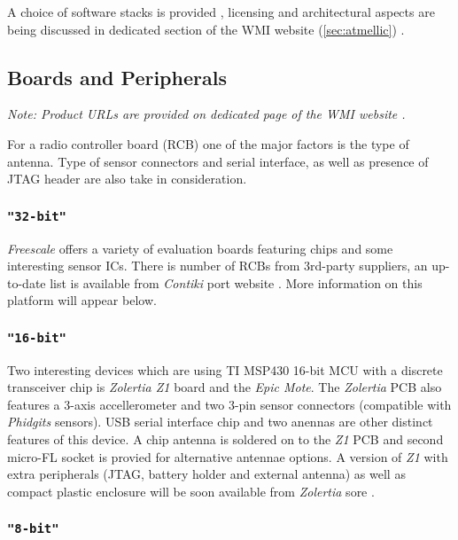  A choice of software stacks is provided \cite{atmel:avr2070,
 atmel:avr2025, atmel:avr2102, atmel:zbpro}, licensing and architectural
 aspects are being discussed in dedicated section of the WMI website
 (\ref{sec:atmellic}) \cite{wmi:wiki:atmelsw}.

\subsection{Boards and Peripherals}

 \emph{Note: Product URLs are provided on dedicated page of the WMI
 website \cite{wmi:wiki:devhw}.}
 \newline

 For a radio controller board (RCB) one of the major factors is the
 type of antenna. Type of sensor connectors and serial interface,
 as well as presence of JTAG header are also take in consideration.

\subsubsection{\texttt{"32-bit"}}

 \emph{Freescale} offers a variety of evaluation boards featuring
  chips and some interesting sensor ICs. There is
 number of  RCBs from 3rd-party suppliers, an
 up-to-date list is available from \emph{Contiki} 
 port website \cite{links:contiki:rcb:mc1322x}. More information
 on this platform will appear below.

\subsubsection{\texttt{"16-bit"}}

 Two interesting devices which are using TI MSP430 16-bit MCU with
 a discrete transceiver chip is \emph{Zolertia Z1} board and the
 \emph{Epic Mote}. The \emph{Zolertia} PCB also features a 3-axis
 accellerometer and two 3-pin sensor connectors (compatible with
 \emph{Phidgits} sensors). USB serial interface chip and two anennas
 are other distinct features of this device. A chip antenna is
 soldered on to the \emph{Z1} PCB and second micro-FL socket is
 provied for alternative antennae options. A version of \emph{Z1}
 with extra peripherals (JTAG, battery holder and external antenna)
 as well as compact plastic enclosure will be soon available
 from \emph{Zolertia} sore \cite{links:zolertia:store}.
 
\subsubsection{\texttt{"8-bit"}}

